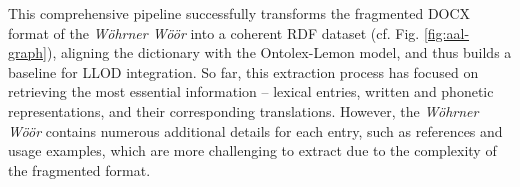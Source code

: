 \noindent
This comprehensive pipeline successfully transforms the fragmented DOCX format of the \emph{Wöhrner Wöör} into a coherent RDF dataset (cf. Fig. \ref{fig:aal-graph}), aligning the dictionary with the Ontolex-Lemon model, and thus builds a baseline for LLOD integration. So far, this extraction process has focused on retrieving the most essential information -- lexical entries, written and phonetic representations, and their corresponding translations. However, the \emph{Wöhrner Wöör} contains numerous additional details for each entry, such as references and usage examples, which are more challenging to extract due to the complexity of the fragmented format.





%
%
%


